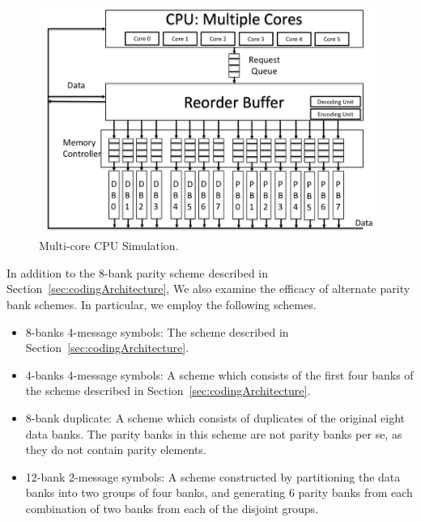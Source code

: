 \begin{figure}[h!] \centering
\includegraphics[width=0.9\linewidth]{figures/multi-core-cpu.png} 
\caption{Multi-core CPU Simulation.}
\label{fig:multi-core-cpu}
\end{figure}

In addition to the 8-bank parity scheme described in Section~\ref{sec:codingArchitecture}, We also examine the efficacy of alternate parity bank schemes. In particular, we employ the following schemes.
\begin{itemize}
	\item 8-banks 4-message symbols: The scheme described in Section~\ref{sec:codingArchitecture}.
	\item 4-banks 4-message symbols: A scheme which consists of the first four banks of the scheme described in Section~\ref{sec:codingArchitecture}.
	\item 8-bank duplicate: A scheme which consists of duplicates of the original eight data banks. The parity banks in this scheme are not parity banks per se, as they do not contain parity elements.
	\item 12-bank 2-message symbols: A scheme constructed by partitioning the data banks into two groups of four banks, and generating 6 parity banks from each combination of two banks from each of the disjoint groups.
\end{itemize}

